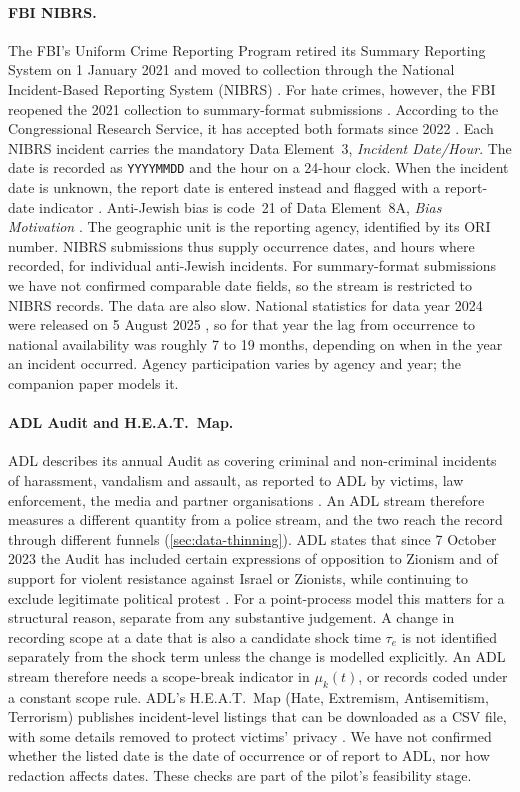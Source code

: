 \paragraph{FBI NIBRS.}
The FBI's Uniform Crime Reporting Program retired its Summary Reporting
System on 1 January 2021 and moved to collection through the National
Incident-Based Reporting System (NIBRS) \citep{fbi2026nibrs}. For hate
crimes, however, the FBI reopened the 2021 collection to summary-format
submissions \citep{fbi2023supp}. According to the Congressional Research
Service, it has accepted both formats since 2022 \citep{crs2025hate}. Each
NIBRS incident carries the mandatory Data Element~3, \emph{Incident
Date/Hour}. The date is recorded as \texttt{YYYYMMDD} and the hour on a
24-hour clock. When the incident date is unknown, the report date is entered
instead and flagged with a report-date indicator
\citep{fbi2025nibrs,fbi2025nibrstech}. Anti-Jewish bias is code~21 of Data
Element~8A, \emph{Bias Motivation} \citep{fbi2025nibrs}. The geographic unit
is the reporting agency, identified by its ORI number. NIBRS submissions
thus supply occurrence dates, and hours where recorded, for individual
anti-Jewish incidents. For summary-format submissions we have not confirmed
comparable date fields, so the stream is restricted to NIBRS records. The
data are also slow. National statistics for data year 2024 were released on
5 August 2025 \citep{fbi2025release}, so for that year the lag from
occurrence to national availability was roughly 7 to 19 months, depending
on when in the year an incident occurred. Agency participation varies by
agency and year; the companion paper models it.

\paragraph{ADL Audit and H.E.A.T.\ Map.}
ADL describes its annual Audit as covering criminal and non-criminal
incidents of harassment, vandalism and assault, as reported to ADL by
victims, law enforcement, the media and partner organisations
\citep{adl2025audit}. An ADL stream therefore measures a different quantity
from a police stream, and the two reach the record through different funnels
(\cref{sec:data-thinning}). ADL states that since 7 October 2023 the Audit
has included certain expressions of opposition to Zionism and of support for
violent resistance against Israel or Zionists, while continuing to exclude
legitimate political protest \citep{adl2025audit}. For a point-process model
this matters for a structural reason, separate from any substantive
judgement. A change in recording scope at a date that is also a candidate
shock time $\tau_e$ is not identified separately from the shock term unless
the change is modelled explicitly. An ADL stream therefore needs a scope-break
indicator in $\mu_k(t)$, or records coded under a constant scope rule. ADL's
H.E.A.T.\ Map (Hate, Extremism, Antisemitism, Terrorism) publishes
incident-level listings that can be downloaded as a CSV file, with some
details removed to protect victims' privacy \citep{adlheatmap}. We have not
confirmed whether the listed date is the date of occurrence or of report to
ADL, nor how redaction affects dates. These checks are part of the pilot's
feasibility stage.

